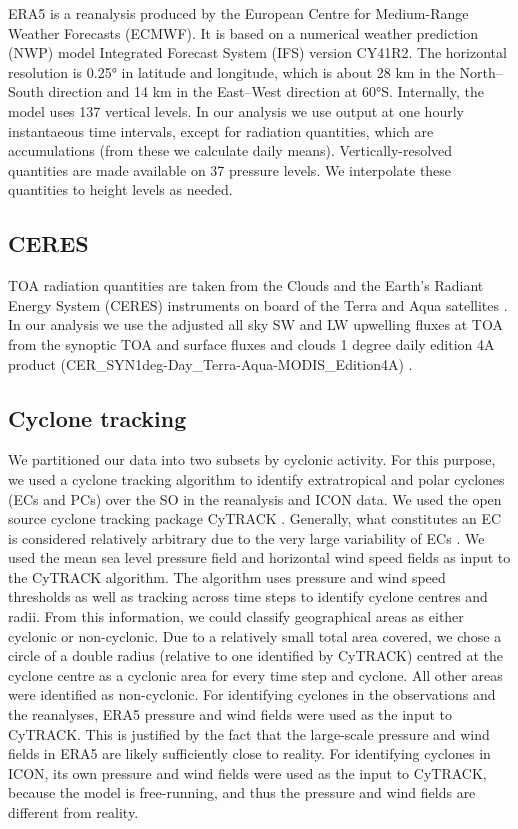 \documentclass[12pt,a4paper]{article}
\begin{document}
ERA5 \citep{era5} is a reanalysis produced by the European Centre for
Medium-Range Weather Forecasts (ECMWF). It is based on a numerical weather
prediction (NWP) model Integrated Forecast System (IFS) version CY41R2.  The
horizontal resolution is 0.25° in latitude and longitude, which is about 28 km
in the North--South direction and 14 km in the East--West direction at 60°S.
Internally, the model uses 137 vertical levels. In our analysis we use output
at one hourly instantaeous time intervals, except for radiation quantities,
which are accumulations (from these we calculate daily means).
Vertically-resolved quantities are made available on 37 pressure levels. We
interpolate these quantities to height levels as needed.

\subsection{CERES}

TOA radiation quantities are taken from the Clouds and the Earth’s Radiant
Energy System (CERES) instruments on board of the Terra and Aqua satellites
\citep{wielicki1996,loeb2018}. In our analysis we use the adjusted all sky SW
and LW upwelling fluxes at TOA from the synoptic TOA and surface fluxes and
clouds 1 degree daily edition 4A product
(CER\_SYN1deg-Day\_Terra-Aqua-MODIS\_Edition4A)
\citep{doelling2013,doelling2016}.

\subsection{Cyclone tracking}

We partitioned our data into two subsets by cyclonic activity. For this
purpose, we used a cyclone tracking algorithm to identify extratropical and
polar cyclones (ECs and PCs) over the SO in the reanalysis and ICON data. We
used the open source cyclone tracking package CyTRACK
\citep{perez-alarcon2024}.  Generally, what constitutes an EC is considered
relatively arbitrary due to the very large variability of ECs \citep{neu2013}.
We used the mean sea level pressure field and horizontal wind speed fields as
input to the CyTRACK algorithm. The algorithm uses pressure and wind speed
thresholds as well as tracking across time steps to identify cyclone centres
and radii. From this information, we could classify geographical areas as
either cyclonic or non-cyclonic. Due to a relatively small total area covered,
we chose a circle of a double radius (relative to one identified by CyTRACK)
centred at the cyclone centre as a cyclonic area for every time step and
cyclone. All other areas were identified as non-cyclonic. For identifying
cyclones in the observations and the reanalyses, ERA5 pressure and wind fields
were used as the input to CyTRACK.  This is justified by the fact that the
large-scale pressure and wind fields in ERA5 are likely sufficiently close to
reality. For identifying cyclones in ICON, its own pressure and wind fields
were used as the input to CyTRACK, because the model is free-running, and thus
the pressure and wind fields are different from reality.
\end{document}
